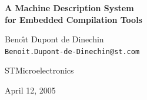 \documentclass[a4]{seminar}
\begin{document}
\thispagestyle{empty}

\begin{slide}

\begin{center}

{\large\bf A Machine Description System \\
for Embedded Compilation Tools}

\vspace{15 mm}

{Beno\^{\i}t Dupont de Dinechin \\
\texttt{Benoit.Dupont-de-Dinechin@st.com}}

\vspace{5 mm}

 {STMicroelectronics}

{\small April 12, 2005}

\end{center}

\end{slide}


\pagestyle{fancy}
\end{document}
